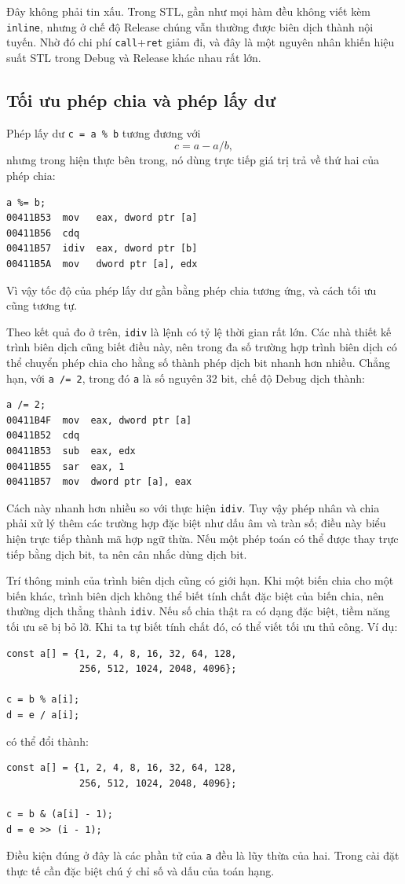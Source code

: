 \documentclass[11pt]{article}
\begin{document}
Đây không phải tin xấu. Trong STL, gần như mọi hàm đều không viết kèm
\texttt{inline}, nhưng ở chế độ Release chúng vẫn thường được biên dịch thành
nội tuyến. Nhờ đó chi phí \texttt{call}+\texttt{ret} giảm đi, và đây là một
nguyên nhân khiến hiệu suất STL trong Debug và Release khác nhau rất lớn.

\subsection{Tối ưu phép chia và phép lấy dư}

Phép lấy dư \texttt{c = a \% b} tương đương với
\[
  c = a - a / b,
\]
nhưng trong hiện thực bên trong, nó dùng trực tiếp giá trị trả về thứ hai của
phép chia:
\begin{verbatim}
a %= b;
00411B53  mov   eax, dword ptr [a]
00411B56  cdq
00411B57  idiv  eax, dword ptr [b]
00411B5A  mov   dword ptr [a], edx
\end{verbatim}

Vì vậy tốc độ của phép lấy dư gần bằng phép chia tương ứng, và cách tối ưu
cũng tương tự.

Theo kết quả đo ở trên, \texttt{idiv} là lệnh có tỷ lệ thời gian rất lớn. Các
nhà thiết kế trình biên dịch cũng biết điều này, nên trong đa số trường hợp
trình biên dịch có thể chuyển phép chia cho hằng số thành phép dịch bit nhanh
hơn nhiều. Chẳng hạn, với \texttt{a /= 2}, trong đó \texttt{a} là số nguyên
32 bit, chế độ Debug dịch thành:
\begin{verbatim}
a /= 2;
00411B4F  mov  eax, dword ptr [a]
00411B52  cdq
00411B53  sub  eax, edx
00411B55  sar  eax, 1
00411B57  mov  dword ptr [a], eax
\end{verbatim}

Cách này nhanh hơn nhiều so với thực hiện \texttt{idiv}. Tuy vậy phép nhân và
chia phải xử lý thêm các trường hợp đặc biệt như dấu âm và tràn số; điều này
biểu hiện trực tiếp thành mã hợp ngữ thừa. Nếu một phép toán có thể được thay
trực tiếp bằng dịch bit, ta nên cân nhắc dùng dịch bit.

Trí thông minh của trình biên dịch cũng có giới hạn. Khi một biến chia cho một
biến khác, trình biên dịch không thể biết tính chất đặc biệt của biến chia, nên
thường dịch thẳng thành \texttt{idiv}. Nếu số chia thật ra có dạng đặc biệt,
tiềm năng tối ưu sẽ bị bỏ lỡ. Khi ta tự biết tính chất đó, có thể viết tối ưu
thủ công. Ví dụ:
\begin{verbatim}
const a[] = {1, 2, 4, 8, 16, 32, 64, 128,
             256, 512, 1024, 2048, 4096};

c = b % a[i];
d = e / a[i];
\end{verbatim}
có thể đổi thành:
\begin{verbatim}
const a[] = {1, 2, 4, 8, 16, 32, 64, 128,
             256, 512, 1024, 2048, 4096};

c = b & (a[i] - 1);
d = e >> (i - 1);
\end{verbatim}
Điều kiện đúng ở đây là các phần tử của \texttt{a} đều là lũy thừa của hai.
Trong cài đặt thực tế cần đặc biệt chú ý chỉ số và dấu của toán hạng.
\end{document}
